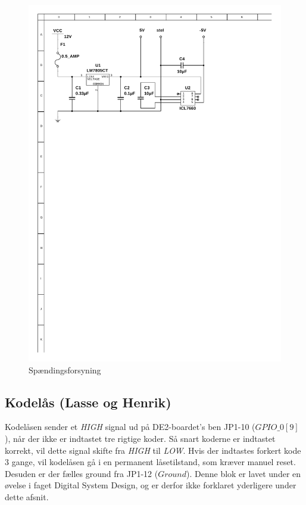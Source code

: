 \begin{figure}[h]
	\centering
	\includegraphics[scale=1,trim=50 555 150 50, clip=true]{../HardwareDesign/Diagrammer/Stroemforsyning.pdf}
	\caption{Spændingsforsyning}
	\label{fig:Stromforsyning}
\end{figure}

\subsection{Kodelås (Lasse og Henrik)}
Kodelåsen sender et \textit{HIGH} signal ud på DE2-boardet's ben JP1-10 ($GPIO{\_}0[9]$), når der ikke er indtastet tre rigtige koder. Så snart koderne er indtastet korrekt, vil dette signal skifte fra \textit{HIGH} til \textit{LOW}. Hvis der indtastes forkert kode 3 gange, vil kodelåsen gå i en permanent låsetilstand, som kræver manuel reset. Desuden er der fælles ground fra JP1-12 ($Ground$).
Denne blok er lavet under en øvelse i faget Digital System Design, og er derfor ikke forklaret yderligere under dette afsnit.

